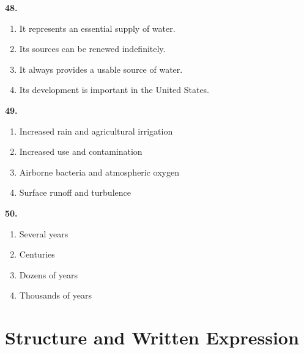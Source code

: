 \documentclass[12pt]{article}
\begin{document}
\noindent\textbf{48.}
\begin{enumerate}[label=(\Alph*),leftmargin=*,itemsep=0.2em]
\item It represents an essential supply of water.
\item Its sources can be renewed indefinitely.
\item It always provides a usable source of water.
\item Its development is important in the United States.
\end{enumerate}
\par
\vspace{0.25\baselineskip}
\noindent\textbf{49.}
\begin{enumerate}[label=(\Alph*),leftmargin=*,itemsep=0.2em]
\item Increased rain and agricultural irrigation
\item Increased use and contamination
\item Airborne bacteria and atmospheric oxygen
\item Surface runoff and turbulence
\end{enumerate}
\par
\vspace{0.25\baselineskip}
\noindent\textbf{50.}
\begin{enumerate}[label=(\Alph*),leftmargin=*,itemsep=0.2em]
\item Several years
\item Centuries
\item Dozens of years
\item Thousands of years
\end{enumerate}
\par
\vspace{0.25\baselineskip}
\section*{Structure and Written Expression}
\end{document}
